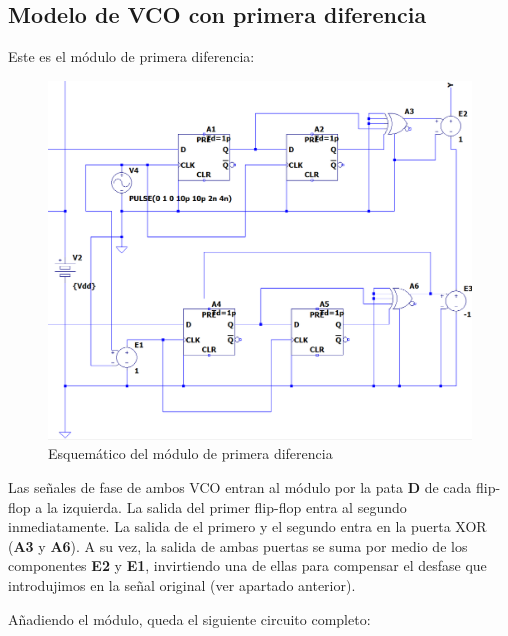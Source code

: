 \documentclass[12pt]{report} %
\begin{document}
	\subsection{Modelo de VCO con primera diferencia}
	
	
	Este es el módulo de primera diferencia:
	
	\begin{figure}[H]
		\includegraphics[width=\textwidth]{ltspice-vco-closed-diff-module.PNG}
		\caption[Esquemático del módulo de primera diferencia]{Esquemático del módulo de primera diferencia}
		\label{fig:ltspice-vco-closed-diff-module.PNG}
	\end{figure}
	
	Las señales de fase de ambos VCO entran al módulo por la pata \textbf{D} de cada flip-flop a la izquierda. La salida del primer flip-flop entra al segundo inmediatamente. La salida de el primero y el segundo entra en la puerta XOR (\textbf{A3} y \textbf{A6}). A su vez, la salida de ambas puertas se suma por medio de los componentes \textbf{E2} y \textbf{E1}, invirtiendo una de ellas para compensar el desfase que introdujimos en la señal original (ver apartado anterior). %
	
	Añadiendo el módulo, queda el siguiente circuito completo:
	
\end{document}
